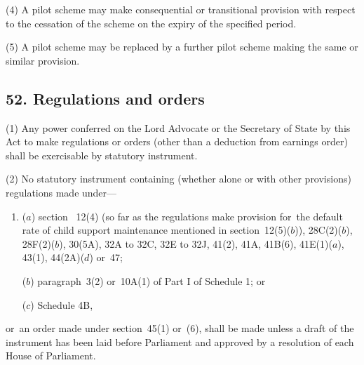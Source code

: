 \documentclass[12pt,a4paper]{article}
\begin{document}
(4)
A pilot scheme may make consequential or transitional provision with respect to the cessation of the scheme on the expiry of the specified period.

(5)
A pilot scheme may be replaced by a further pilot scheme making the same or similar provision.


\subsection{52. Regulations and orders}

(1) Any power conferred on 
the Lord Advocate or the Secretary of State by this Act to make regulations or orders (other than a deduction from earnings order) shall be exercisable by statutory instrument.

(2) No statutory instrument containing (whether alone or with other provisions) regulations made under—
\begin{enumerate}\item[]
($a$) section~%
12(4)  (so far as the regulations make provision for~the default rate of child support maintenance mentioned in section~12(5)($b$)), 28C(2)($b$), 28F(2)($b$), 30(5A), 
32A to 32C, 32E to 32J,  %
41(2), 41A, 41B(6), 
41E(1)($a$),  %
43(1), 44(2A)($d$)
or~47;

($b$) paragraph~3(2)  or~10A(1)  of Part I of Schedule 1; or

($c$) Schedule 4B,
\end{enumerate}
or~an order made under section~45(1)  or~(6), shall be made unless a draft of the instrument has been laid before Parliament and approved by a resolution of each House of Parliament.

\end{document}
